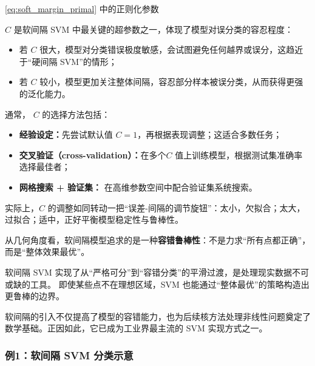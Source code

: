 \eqref{eq:soft_margin_primal} 中的正则化参数{$C$ 是软间隔 SVM 中最关键的超参数之一，体现了模型对误分类的容忍程度：
\begin{itemize}
\item  若 $C$ 很大，模型对分类错误极度敏感，会试图避免任何越界或误分，这趋近于“硬间隔 SVM”的情形；
\item 若 $C$ 较小，模型更加关注整体间隔，容忍部分样本被误分类，从而获得更强的泛化能力。
\end{itemize}

通常， $C$  的选择方法包括：
\begin{itemize}
\item {\bf 经验设定：}先尝试默认值 $C=1$，再根据表现调整；这适合多数任务；

\item {\bf 交叉验证（cross-validation）：}在多个$C$ 值上训练模型，根据测试集准确率选择最佳者；

\item {\bf 网格搜索 + 验证集：} 在高维参数空间中配合验证集系统搜索。 
\end{itemize}

实际上，$C$  的调整如同转动一把“误差-间隔的调节旋钮”：太小，欠拟合；太大，过拟合；适中，正好平衡模型稳定性与鲁棒性。

从几何角度看，软间隔模型追求的是一种{\bf 容错鲁棒性}：不是力求“所有点都正确”，而是“整体效果最优”。

软间隔 SVM 实现了从“严格可分”到“容错分类”的平滑过渡，是处理现实数据不可或缺的工具。
即使某些点不在理想区域，SVM 也能通过“整体最优”的策略构造出更鲁棒的边界。

%

软间隔的引入不仅提高了模型的容错能力，也为后续核方法处理非线性问题奠定了数学基础。正因如此，它已成为工业界最主流的 SVM 实现方式之一。

\subsubsection*{例1：软间隔 SVM 分类示意 } 

}
